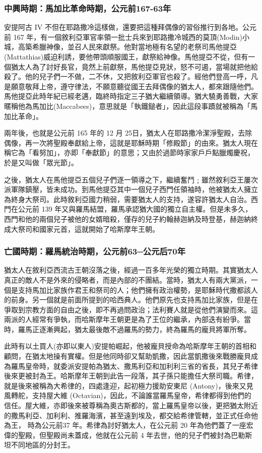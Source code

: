\subsubsection{中興時期：馬加比革命時期，公元前167-63年}
安提阿古 IV 不但在耶路撒冷這樣做，還要把這種拜偶像的習俗推行到各地。公元前 167 年，有一個敘利亞軍官率領一批士兵來到耶路撒冷城西的莫頂(Modin)小城，高築希臘神像，並召人民來獻祭。他對當地極有名望的老祭司馬他提亞(Mattathias)威迫利誘，要他帶頭順服國王，獻祭給神像。馬他提亞不從，但有一個猶太人為了討好長官，竟然上前獻祭，馬他提亞見狀，怒不可遏，當場就把他給殺了。他的兒子們一不做，二不休，又把敘利亞軍官也殺了。經他們登高一呼，凡是願意敬拜上帝，遵守律法，不願意聽從國王去拜偶像的猶太人，都來跟隨他們。馬他提亞此時年紀已經老邁，臨終時指定三子猶大繼續領導。猶大驍勇善戰，大家暱稱他為馬加比(Maccabees)，意思就是「執鐵鎚者」，因此這段事蹟就被稱為「馬加比革命」。

兩年後，也就是公元前 165 年的 12 月 25日，猶太人在耶路撒冷潔淨聖殿，去除偶像，再一次將聖殿奉獻給上帝，這就是耶穌時期「修殿節」的由來。猶太人現在稱它為「看努加」，亦即「奉獻節」的意思；又由於過節時家家戶戶點臘燭慶祝，於是又叫做「眾光節」。

之後，猶太人在馬他提亞五個兒子們逐一領導之下，繼續奮鬥﹔雖然敘利亞王屢次派軍隊鎮壓，皆未成功。到馬他提亞其中一個兒子西門任領袖時，他被猶太人擁立為終身大祭司。此時敘利亞國力稍弱，需要猶太人的支持，遂容許猶太人自治。西門在公元前 139 年又與羅馬結盟，羅馬承認猶大國的獨立自主權。但是未多久，西門和他的兩個兒子被他的女婿暗殺，僅存的兒子約翰赫迦納及時登基，赫迦納終成大祭司和國家元首，這就開始了哈斯摩年王朝。

\subsubsection{亡國時期：羅馬統治時期，公元前63─公元后70年}

猶太人在敘利亞西流古王朝沒落之後，經過一百多年光榮的獨立時期。其實猶太人真正的敵人不是外來的侵略者，而是內部的不團結。當時，猶太人有兩大黨派，一個是支持馬加比家族作君王和祭司的人；他們擁有政治權勢，是耶穌時代撒都該人的前身。另一個就是前面所提到的哈西典人。他們原先也支持馬加比家族，但是在爭取到宗教方面的自由之後，即不再過問政治；法利賽人就是從他們演變而來。這兩派的人經常有爭執，而哈斯摩年王朝更是為了王位的繼承，內部迭有紛爭。當時，羅馬正逐漸興起，猶太最後敵不過羅馬的勢力，終為羅馬的龐貝將軍所奪。

此時有以土買人(亦即以東人)安提帕崛起，他被龐貝授命為哈斯摩年王朝的首相和顧問，在猶太地操有實權。但是他同時卻又幫助凱撒，因此當凱撒後來戰勝龐貝成為羅馬皇帝時，就委派安提帕為猶太、撒馬利亞和加利利三省的省長，其兒子希律後來更被封為王。哈斯摩年王朝到此告一段落，其子孫只能擔任大祭司職。希律，就是後來被稱為大希律的，四處逢迎，起初極力援助安東尼 (Antony)，後來又見風轉舵，支持屋大維 (Octavian)，因此，不論誰當羅馬皇帝，希律都得到他們的信任。屋大維，亦即後來被尊稱為奧古斯都的，當上羅馬皇帝以後，更把猶太附近的撒馬利亞、加利利、推羅海濱，甚至遠到埃及，都交給希律管轄，並正式任命他為王， 時為公元前37 年。希律為討好猶太人，在公元前 20 年為他們蓋了一座宏偉的聖殿，但聖殿尚未蓋成，他就在公元前 4 年去世，他的兒子們被封為巴勒斯坦不同地區的分封王。

